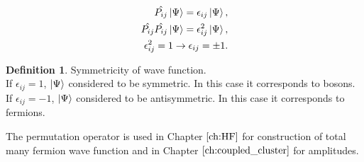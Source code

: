 \documentclass[twoside,english]{uiofysmaster}
\theoremstyle{definition}
\newtheorem{defn}{Definition}
\begin{document}
\begin{eqnarray}
\hat{P_{ij}}\ket{\Psi}=\epsilon_{ij}\ket{\Psi},\\
\hat{P_{ij}}\hat{P_{ij}}\ket{\Psi}= \epsilon_{ij}^2 \ket{\Psi},\\
\epsilon_{ij}^2 =1 \rightarrow \epsilon_{ij} = \pm 1.
\end{eqnarray}
\begin{defn}Symmetricity of wave function.\\
If $\epsilon_{ij}=1$,  $\ket{\Psi}$ considered to be symmetric. In this case it corresponds to bosons.\\
If $\epsilon_{ij}=-1$,  $\ket{\Psi}$ considered to be antisymmetric. In this case it corresponds to fermions.
\end{defn}
The permutation operator is used in Chapter $\ref{ch:HF}$ for construction of total many fermion wave function and in Chapter $\ref{ch:coupled_cluster}$ for amplitudes.
\end{document}
